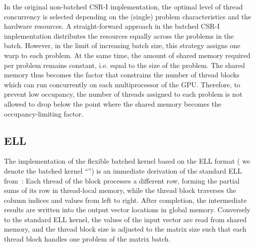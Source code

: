In the original non-batched CSR-I implementation, the optimal level of thread
concurrency is selected depending on the (single) problem characteristics and the hardware resources.
A straight-forward approach in the batched CSR-I implementation 
distributes the resources equally across the problems in the batch.
However, in the limit of increasing batch size, this strategy assigns one warp to each problem.
At the same time, the amount of shared memory required per problem remains constant,
i.e. equal to the size of the problem.
The shared memory thus becomes the factor that constrains the number of
thread blocks which can run concurrently on each multiprocessor of the GPU.
Therefore, to prevent low occupancy, the number of threads assigned to each
problem is not allowed to drop below the point where the shared memory becomes the 
occupancy-limiting factor.

\subsection{ELL}
The implementation of the flexible batched \spmv kernel based on the ELL format
( we denote the batched kernel ``\ell'')
is an immediate derivation of the standard ELL \spmv from~\cite{ellpack}:
Each thread of the block processes a different row, forming the partial
sums of its row in thread-local memory, while the thread block traverses the column indices
and values from left to right. After completion, the intermediate results are written into the output
vector locations in global memory.
Conversely to the standard ELL kernel, the values of the input vector are read from shared memory,
and the thread block size is adjusted to the matrix size such that each thread block handles
one problem of the matrix batch.

